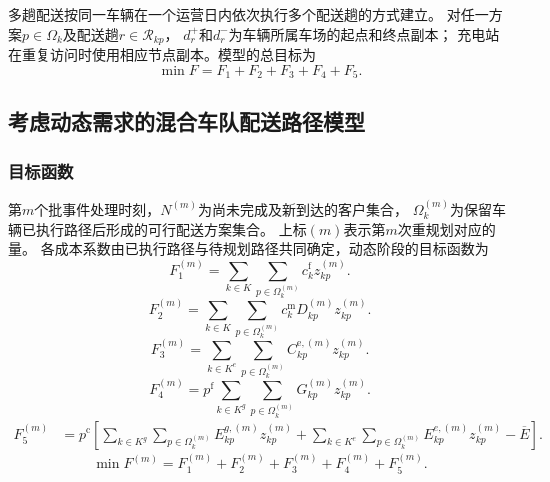 \documentclass{setp-new}
\begin{document}
多趟配送按同一车辆在一个运营日内依次执行多个配送趟的方式建立\cite{ref:44}。
对任一方案$p\in\Omega_k$及配送趟$r\in\mathcal R_{kp}$，
$d_r^{+}$和$d_r^{-}$为车辆所属车场的起点和终点副本；
充电站在重复访问时使用相应节点副本。模型的总目标为
\begin{equation}
\min F=F_1+F_2+F_3+F_4+F_5.
\label{eq:unified-objective}
\end{equation}

\subsection{考虑动态需求的混合车队配送路径模型}

\subsubsection{目标函数}

第$m$个批事件处理时刻，$N^{(m)}$为尚未完成及新到达的客户集合，
$\Omega_k^{(m)}$为保留车辆已执行路径后形成的可行配送方案集合。
上标$(m)$表示第$m$次重规划对应的量。
各成本系数由已执行路径与待规划路径共同确定，动态阶段的目标函数为\cite{ref:71}
\begin{equation}
F_1^{(m)}
=\sum_{k\in K}\sum_{p\in\Omega_k^{(m)}}c_k^{\mathrm f}z_{kp}^{(m)}.
\label{eq:unified-dynamic-f1}
\end{equation}
\begin{equation}
F_2^{(m)}
=\sum_{k\in K}\sum_{p\in\Omega_k^{(m)}}c_k^{\mathrm m}D_{kp}^{(m)}z_{kp}^{(m)}.
\label{eq:unified-dynamic-f2}
\end{equation}
\begin{equation}
F_3^{(m)}
=\sum_{k\in K^{e}}\sum_{p\in\Omega_k^{(m)}}C_{kp}^{\mathrm e,(m)}z_{kp}^{(m)}.
\label{eq:unified-dynamic-f3}
\end{equation}
\begin{equation}
F_4^{(m)}
=p^{\mathrm f}\sum_{k\in K^{g}}\sum_{p\in\Omega_k^{(m)}}G_{kp}^{(m)}z_{kp}^{(m)}.
\label{eq:unified-dynamic-f4}
\end{equation}
\begin{equation}
\begin{aligned}
F_5^{(m)}
&=p^{\mathrm c}\left[
\sum_{k\in K^{g}}\sum_{p\in\Omega_k^{(m)}}E_{kp}^{g,(m)}z_{kp}^{(m)}
+\sum_{k\in K^{e}}\sum_{p\in\Omega_k^{(m)}}E_{kp}^{e,(m)}z_{kp}^{(m)}
-\overline E
\right].
\end{aligned}
\label{eq:unified-dynamic-f5}
\end{equation}
\begin{equation}
\min F^{(m)}
=F_1^{(m)}+F_2^{(m)}+F_3^{(m)}+F_4^{(m)}+F_5^{(m)}.
\label{eq:unified-dynamic-objective}
\end{equation}
\end{document}
